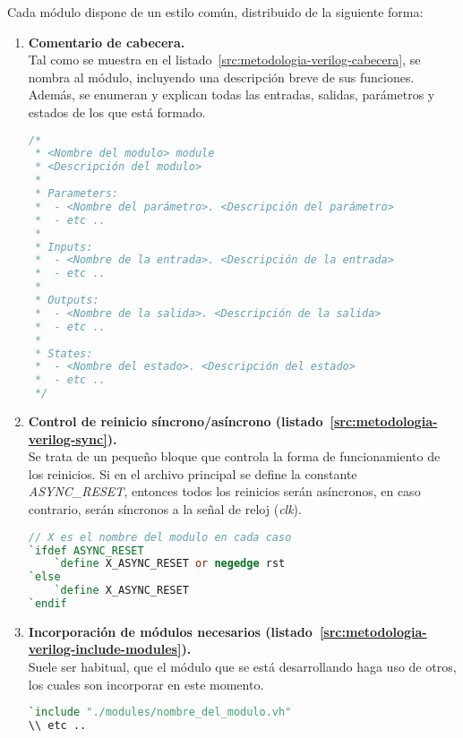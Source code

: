 Cada módulo dispone de un estilo común, distribuido de la siguiente forma:
\begin{enumerate}
    \item{\textbf{Comentario de cabecera.}} \\
    Tal como se muestra en el listado~\ref{src:metodologia-verilog-cabecera}, se nombra al módulo, incluyendo una descripción breve de sus funciones. Además, se enumeran y explican todas las entradas, salidas, parámetros y estados de los que está formado.
    \begin{lstlisting}[language=Verilog,
        caption={Ejemplo de comentario de cabecera del módulo.},
        label=src:metodologia-verilog-cabecera]
/*
 * <Nombre del modulo> module
 * <Descripción del modulo>
 *
 * Parameters:
 *  - <Nombre del parámetro>. <Descripción del parámetro>
 *  - etc ..
 *
 * Inputs:
 *  - <Nombre de la entrada>. <Descripción de la entrada>
 *  - etc ..
 *
 * Outputs:
 *  - <Nombre de la salida>. <Descripción de la salida>
 *  - etc ..
 *
 * States:
 *  - <Nombre del estado>. <Descripción del estado>
 *  - etc ..
 */
    \end{lstlisting}

    \item{\textbf{Control de reinicio síncrono/asíncrono (listado~\ref{src:metodologia-verilog-sync}).}} \\
    Se trata de un pequeño bloque que controla la forma de funcionamiento de los reinicios. Si en el archivo principal se define la constante \emph{ASYNC\_RESET}, entonces todos los reinicios serán asíncronos, en caso contrario, serán síncronos a la señal de reloj (\emph{clk}).
    \begin{lstlisting}[language=Verilog,
        caption={Ejemplo de control de reinicio síncrono/asíncrono.},
        label=src:metodologia-verilog-sync]
// X es el nombre del modulo en cada caso
`ifdef ASYNC_RESET
    `define X_ASYNC_RESET or negedge rst
`else
    `define X_ASYNC_RESET
`endif
    \end{lstlisting}
        
    \item{\textbf{Incorporación de módulos necesarios (listado~\ref{src:metodologia-verilog-include-modules}).}} \\
    Suele ser habitual, que el módulo que se está desarrollando haga uso de otros, los cuales son incorporar en este momento.
    \begin{lstlisting}[language=Verilog,
        caption={Ejemplo de incorporación de módulos.},
        label=src:metodologia-verilog-include-modules]
`include "./modules/nombre_del_modulo.vh"
\\ etc ..
    \end{lstlisting}
        

\end{enumerate}
